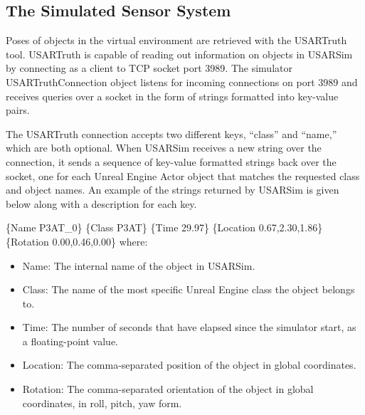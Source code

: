\subsection{The Simulated Sensor System}
\label{subsection:usartruth}
Poses of objects in the virtual environment are retrieved with the USARTruth tool. USARTruth is capable of reading out information on objects in USARSim by connecting as a client to TCP socket port 3989. The simulator USARTruthConnection object listens for incoming connections on port 3989 and receives queries over a socket in the form of strings formatted into key-value pairs. 

The USARTruth connection accepts two different keys, ``class'' and ``name,'' which are both optional. When USARSim receives a new string over the connection, it sends a sequence of key-value formatted strings back over the socket, one for each Unreal Engine Actor object that matches the requested class and object names. An example of the strings returned by USARSim is given below along with a description for each key.


\{Name P3AT\_0\} \{Class P3AT\} \{Time 29.97\} \{Location 0.67,2.30,1.86\} \\ \{Rotation 0.00,0.46,0.00\} where:

\begin{itemize}
\item Name: The internal name of the object in USARSim.
\item Class: The name of the most specific Unreal Engine class the object belongs to.
\item Time: The number of seconds that have elapsed since the simulator start, as a floating-point value.
\item Location: The comma-separated position of the object in global coordinates.
\item Rotation: The comma-separated orientation of the object in global coordinates, in roll, pitch, yaw form.
\end{itemize}



